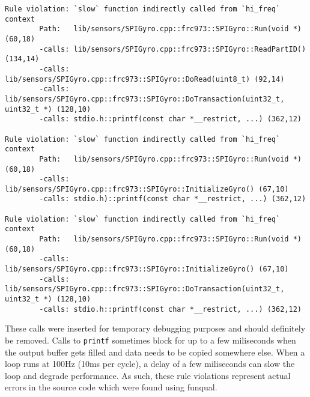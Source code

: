 \noindent\begin{minipage}[t]{\linewidth}
\begin{lstlisting}[caption={Output of running funqual on robotics library.  This is not the entire output, but rather a small snippet of it},label={lst:app:blocking:output}]
Rule violation: `slow` function indirectly called from `hi_freq` context
        Path:   lib/sensors/SPIGyro.cpp::frc973::SPIGyro::Run(void *) (60,18)
        -calls: lib/sensors/SPIGyro.cpp::frc973::SPIGyro::ReadPartID() (134,14)
        -calls: lib/sensors/SPIGyro.cpp::frc973::SPIGyro::DoRead(uint8_t) (92,14)
        -calls: lib/sensors/SPIGyro.cpp::frc973::SPIGyro::DoTransaction(uint32_t, uint32_t *) (128,10)
        -calls: stdio.h::printf(const char *__restrict, ...) (362,12)

Rule violation: `slow` function indirectly called from `hi_freq` context
        Path:   lib/sensors/SPIGyro.cpp::frc973::SPIGyro::Run(void *) (60,18)
        -calls: lib/sensors/SPIGyro.cpp::frc973::SPIGyro::InitializeGyro() (67,10)
        -calls: stdio.h)::printf(const char *__restrict, ...) (362,12)

Rule violation: `slow` function indirectly called from `hi_freq` context
        Path:   lib/sensors/SPIGyro.cpp::frc973::SPIGyro::Run(void *) (60,18)
        -calls: lib/sensors/SPIGyro.cpp::frc973::SPIGyro::InitializeGyro() (67,10)
        -calls: lib/sensors/SPIGyro.cpp::frc973::SPIGyro::DoTransaction(uint32_t, uint32_t *) (128,10)
        -calls: stdio.h::printf(const char *__restrict, ...) (362,12)
\end{lstlisting}
\end{minipage}

These calls were inserted for temporary debugging purposes and should definitely be removed.  Calls to \lstinline{printf} sometimes block for up to a few miliseconds when the output buffer gets filled and data needs to be copied somewhere else.  When a loop runs at 100Hz (10ms per cycle), a delay of a few miliseconds can slow the loop and degrade performance.  As such, these rule violations represent actual errors in the source code which were found using funqual.  
